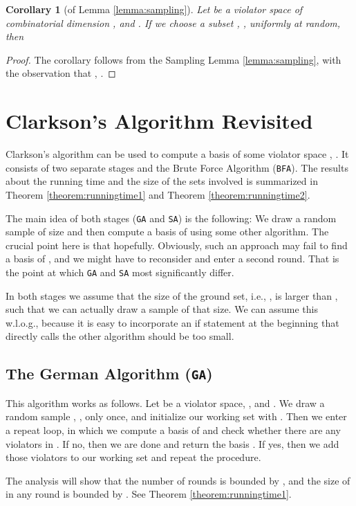 \documentclass[12pt]{article}
\newtheorem{corollary2}[theorem2]{Corollary}
\newenvironment{corollary}{\begin{corollary2}}{\end{corollary2}}
\theoremstyle{remark}
\def\stageI{\texttt{GA}}
\def\stageII{\texttt{SA}}
\def\stageIII{\texttt{BFA}}
\begin{document}
\begin{corollary}[of Lemma \ref{lemma:sampling}]
Let  be a violator space of combinatorial dimension , and . If we choose
a subset , , uniformly at random, then

\end{corollary}
\begin{proof}
The corollary follows from the Sampling Lemma \ref{lemma:sampling}, with the observation
that , .
\end{proof}

\section{Clarkson's Algorithm Revisited}
Clarkson's algorithm can be used to compute a basis of some violator space , .
It consists of two separate stages
and the Brute Force Algorithm (\stageIII). 
The results about the running time and the size of the sets involved is summarized in
Theorem \ref{theorem:runningtime1} and Theorem \ref{theorem:runningtime2}.

The main idea of both stages (\stageI{ }and \stageII) is the following:  We draw a random sample  of
size  and then compute a basis of  using some other algorithm. The crucial point here is that  hopefully. Obviously,
such an approach may fail to find a basis of , and we might have to reconsider and enter a second round.
That is the point at which \stageI{ }and \stageII{ }most significantly differ.

In both stages we assume that the size of the ground set, i.e., , is larger than , such that we can
actually draw a sample of that size. We can assume this w.l.o.g., because it is easy to
incorporate an if statement at the beginning that directly calls the other algorithm should  be too small. 

\subsection{The German Algorithm (\stageI)}
This algorithm works as follows. Let  be a violator space, , and .
 We draw a random sample , , only once, 
and initialize our working set  with . Then we enter a repeat loop, in which we compute a
basis  of  and check whether there are any violators in . If no,
then we are done and return the basis . If yes, then we add those violators to our working
set  and repeat the procedure.

The analysis will show that  the number of rounds is bounded by , and 
the size of  in any round is bounded by . See Theorem \ref{theorem:runningtime1}.
\end{document}
